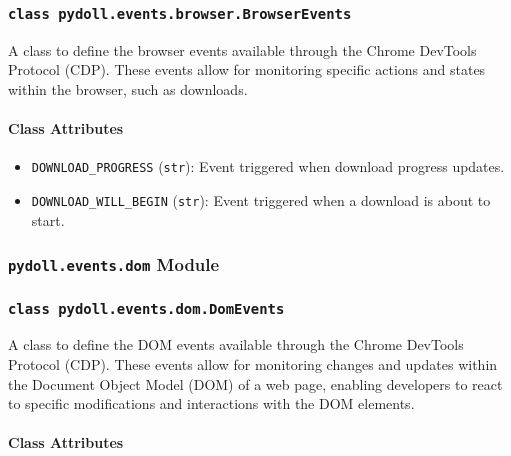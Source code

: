 \documentclass{article}
\begin{document}
\subsubsection*{\texttt{class pydoll.events.browser.BrowserEvents}}
\noindent A class to define the browser events available through the Chrome DevTools Protocol (CDP). These events allow for monitoring specific actions and states within the browser, such as downloads.

\paragraph{Class Attributes}

\begin{itemize}
    \item \lstinline[style=pythonstyle]|DOWNLOAD_PROGRESS| (\lstinline[style=pythonstyle]|str|): Event triggered when download progress updates.
    \item \lstinline[style=pythonstyle]|DOWNLOAD_WILL_BEGIN| (\lstinline[style=pythonstyle]|str|): Event triggered when a download is about to start.
\end{itemize}

\subsubsection*{\texttt{pydoll.events.dom} Module}

\subsubsection*{\texttt{class pydoll.events.dom.DomEvents}}
\noindent A class to define the DOM events available through the Chrome DevTools Protocol (CDP). These events allow for monitoring changes and updates within the Document Object Model (DOM) of a web page, enabling developers to react to specific modifications and interactions with the DOM elements.

\paragraph{Class Attributes}
\end{document}

